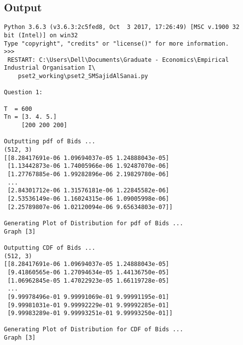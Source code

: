 \documentclass{article}
\begin{document}
\subsection{Output}
\begin{lstlisting}
Python 3.6.3 (v3.6.3:2c5fed8, Oct  3 2017, 17:26:49) [MSC v.1900 32 bit (Intel)] on win32
Type "copyright", "credits" or "license()" for more information.
>>> 
 RESTART: C:\Users\Dell\Documents\Graduate - Economics\Empirical Industrial Organisation I\
	pset2_working\pset2_SMSajidAlSanai.py 

Question 1:

T  = 600
Tn = [3. 4. 5.]
     [200 200 200]

Outputting pdf of Bids ...
(512, 3)
[[8.28417691e-06 1.09694037e-05 1.24888043e-05]
 [1.13442873e-06 1.74005966e-06 1.92487070e-06]
 [1.27767885e-06 1.99282896e-06 2.19829780e-06]
 ...
 [2.84301712e-06 1.31576181e-06 1.22845582e-06]
 [2.53536149e-06 1.16024315e-06 1.09005998e-06]
 [2.25789807e-06 1.02120094e-06 9.65634803e-07]]

Generating Plot of Distribution for pdf of Bids ...
Graph [3]

Outputting CDF of Bids ...
(512, 3)
[[8.28417691e-06 1.09694037e-05 1.24888043e-05]
 [9.41860565e-06 1.27094634e-05 1.44136750e-05]
 [1.06962845e-05 1.47022923e-05 1.66119728e-05]
 ...
 [9.99978496e-01 9.99991069e-01 9.99991195e-01]
 [9.99981031e-01 9.99992229e-01 9.99992285e-01]
 [9.99983289e-01 9.99993251e-01 9.99993250e-01]]

Generating Plot of Distribution for CDF of Bids ...
Graph [3]


\end{lstlisting}
\end{document}
